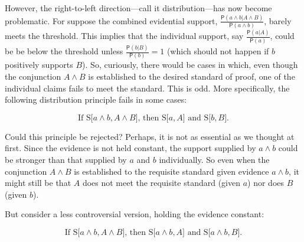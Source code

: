 \documentclass[10pt,dvipsnames,enabledeprecatedfontcommands]{scrartcl}
\newcommand{\et}{\wedge}
\newcommand{\pr}[1]{\mathsf{P}(#1)}
\begin{document}
However, the right-to-left direction---call it distribution---has now
become problematic. For suppose the combined evidential support,
\(\frac{\pr{a \et b | A \et B}}{\pr{a \et b}}\), barely meets the
threshold. This implies that the individual support, say
\(\frac{\pr{a |A}}{\pr{a}}\), could be be below the threshold unless
\(\frac{\pr{b |B}}{\pr{b}}=1\)
(which should not happen if \(b\) positively supports \(B\)). So,
curiously, there would be cases in which, even though the conjunction
\(A\et B\) is established to the desired standard of proof, one of the
individual claims fails to meet the standard. This is odd. More
specifically, the following distribution principle fails in some cases:

\[\text{If S[$a \wedge b, A\wedge B$], then S[$a, A$] and S[$b, B$].} \tag{DIS1}\]

\noindent Could this principle be rejected? Perhaps, it is not as
essential as we thought at first. Since the evidence is not held
constant, the support supplied by \(a\wedge b\) could be stronger than
that supplied by \(a\) and \(b\) individually. So even when the
conjunction \(A \wedge B\) is established to the requisite standard
given evidence \(a\wedge b\), it might still be that \(A\) does not meet
the requisite standard (given \(a\)) nor does \(B\) (given \(b\)).

But consider a less controversial version, holding the evidence
constant:

\[\text{If S[$a \wedge b, A\wedge B$], then S[$a \wedge b, A$] and S[$a \wedge b, B$].} \tag{DIS2}\]
\end{document}
